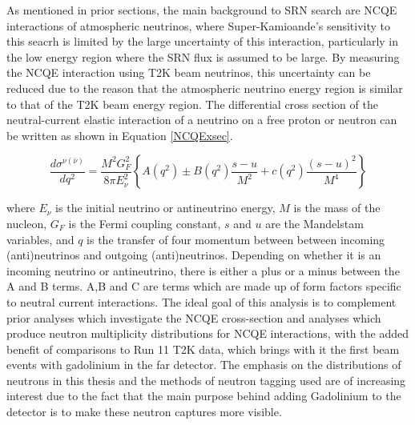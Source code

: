 As mentioned in prior sections, the main background to SRN search are NCQE interactions of atmospheric neutrinos, where Super-Kamioande's sensitivity to this seacrh is limited by the large uncertainty of this interaction, particularly in the low energy region where the SRN flux is assumed to be large. By measuring the NCQE interaction using T2K beam neutrinos, this uncertainty can be reduced due to the reason that the atmospheric neutrino energy region is similar to that of the T2K beam energy region. The differential cross section of the neutral-current elastic interaction of a neutrino on a free proton or neutron can be written as shown in Equation \ref{NCQExsec}. 

\begin{equation}
\frac{d \sigma^{\nu(\bar{\nu})}}{d q^{2}}=\frac{M^{2} G_{F}^{2}}{8 \pi E_{\nu}^{2}}\left\{A\left(q^{2}\right) \pm B\left(q^{2}\right) \frac{s-u}{M^{2}}+c\left(q^{2}\right) \frac{(s-u)^{2}}{M^{4}}\right\}
\label{NCQExsec}
\end{equation}
    
where $E_{\nu}$ is the initial neutrino or antineutrino energy, $M$ is the mass of the nucleon, $G_{F}$ is the Fermi coupling constant, $s$ and $u$ are the Mandelstam variables, and $q$ is the transfer of four momentum between between incoming (anti)neutrinos and outgoing (anti)neutrinos. Depending on whether it is an incoming neutrino or antineutrino, there is either a plus or a minus between the A and B terms. A,B and C are terms which are made up of form factors specific to neutral current interactions. The ideal goal of this analysis is to complement prior analyses which investigate the NCQE cross-section and analyses which produce neutron multiplicity distributions for NCQE interactions, with the added benefit of comparisons to Run 11 T2K data, which brings with it the first beam events with gadolinium in the far detector. The emphasis on the distributions of neutrons in this thesis and the methods of neutron tagging used are of increasing interest due to the fact that the main purpose behind adding Gadolinium to the detector is to make these neutron captures more visible. 



